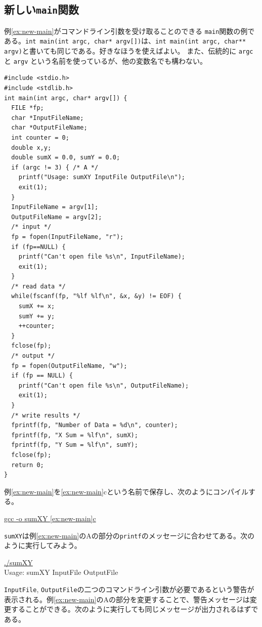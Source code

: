 \subsection{新しい{\tt main}関数}
例\ref{ex:new-main}がコマンドライン引数を受け取ることのできる \verb|main|関数の例である。{\tt int main(int argc, char* argv[])}は、{\tt int main(int argc, char** argv)}と書いても同じである。好きなほうを使えばよい。
また、伝統的に \verb|argc| と \verb|argv| という名前を使っているが、他の変数名でも構わない。
\begin{reidai}\label{ex:new-main}
\begin{verbatim}
#include <stdio.h>
#include <stdlib.h>
int main(int argc, char* argv[]) {
  FILE *fp;
  char *InputFileName;
  char *OutputFileName;
  int counter = 0;
  double x,y;
  double sumX = 0.0, sumY = 0.0;
  if (argc != 3) { /* A */
    printf("Usage: sumXY InputFile OutputFile\n");
    exit(1);
  }
  InputFileName = argv[1];
  OutputFileName = argv[2];
  /* input */
  fp = fopen(InputFileName, "r");
  if (fp==NULL) {
    printf("Can't open file %s\n", InputFileName);
    exit(1);
  }
  /* read data */
  while(fscanf(fp, "%lf %lf\n", &x, &y) != EOF) {
    sumX += x;
    sumY += y;
    ++counter;
  }
  fclose(fp);
  /* output */
  fp = fopen(OutputFileName, "w");
  if (fp == NULL) {
    printf("Can't open file %s\n", OutputFileName);
    exit(1);
  }
  /* write results */
  fprintf(fp, "Number of Data = %d\n", counter);
  fprintf(fp, "X Sum = %lf\n", sumX);
  fprintf(fp, "Y Sum = %lf\n", sumY);
  fclose(fp);
  return 0;
}
\end{verbatim}
\end{reidai} \noindent
例\ref{ex:new-main}を\ref{ex:new-main}cという名前で保存し、次のようにコンパイルする。
\begin{commandline2}
\prompt \underline{gcc -o sumXY \ref{ex:new-main}c}
\end{commandline2} \noindent
\verb|sumXY|は例\ref{ex:new-main}のAの部分の\verb|printf|のメッセージに合わせてある。次のように実行してみよう。
\begin{commandline2}
\prompt \underline{./sumXY}\\
Usage: sumXY InputFile OutputFile
\end{commandline2} \noindent
{\tt InputFile}, {\tt OutputFile}の二つのコマンドライン引数が必要であるという警告が表示される。例\ref{ex:new-main}のAの部分を変更することで、警告メッセージは変更することができる。次のように実行しても同じメッセージが出力されるはずである。
